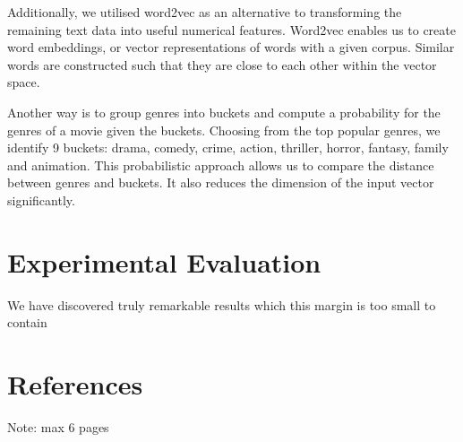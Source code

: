 \documentclass[letterpaper]{article}
\begin{document}
Additionally, we utilised word2vec as an alternative to transforming the remaining text data into useful numerical features. Word2vec enables us to create word embeddings, or vector representations of words with a given corpus. Similar words are constructed such that they are close to each other within the vector space.

Another way is to group genres into buckets and compute a probability for the genres of a movie given the buckets. Choosing from the top popular genres, we identify 9 buckets: drama, comedy, crime, action, thriller, horror, fantasy, family and animation. This probabilistic approach allows us to compare the distance between genres and buckets. It also reduces the dimension of the input vector significantly.
\section{Experimental Evaluation}
We have discovered truly remarkable results which this margin is too small to contain

\section{References}
Note: max 6 pages
\end{document}
